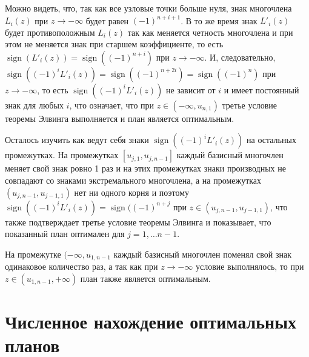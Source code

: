 \documentclass[specialist,
               substylefile = spbu.rtx,
               subf,href,colorlinks=true, 12pt]{disser}
\theoremstyle{definition}
\DeclareMathOperator*{\sign}{sign}
\begin{document}
	Можно видеть, что, так как все узловые точки больше нуля, знак многочлена $L_i(z)$ при $z \to -\infty$ будет равен $(-1)^{n+i+1}$. В то же время знак $L'_i(z)$ будет противоположным $L_i(z)$ так как меняется четность многочлена и при этом не меняется знак при старшем коэффициенте, то есть $\sign(L'_i(z)) = \sign((-1)^{n+i})$ при $z \to -\infty$. И, следовательно, $\sign((-1)^i L'_i(z)) = \sign((-1)^{n+2i}) = \sign((-1)^{n})$ при $z \to -\infty$, то есть $\sign((-1)^i L'_i(z))$ не зависит от $i$ и имеет постоянный знак для любых $i$, что означает, что при $z \in (-\infty, u_{n, 1})$ третье условие теоремы Элвинга выполняется и план является оптимальным.
	
	Осталось изучить как ведут себя знаки $\sign((-1)^i L'_i(z))$ на остальных промежутках. На промежутках $[u_{j, 1}, u_{j, n-1}]$ каждый базисный многочлен меняет свой знак ровно 1 раз и на этих промежутках знаки производных не совпадают со знаками экстремального многочлена, а на промежутках $(u_{j, n-1}, u_{j-1, 1})$ нет ни одного корня и поэтому $\sign((-1)^i L'_i(z)) = \sign ((-1)^{n + j}$ при $z \in (u_{j, n-1}, u_{j-1, 1})$, что также подтверждает третье условие теоремы Элвинга и показывает, что показанный план оптимален для $j=1, \ldots n-1$.
	
	На промежутке $(-\infty, u_{1, n-1}$ каждый базисный многочлен поменял свой знак одинаковое количество раз, а так как при $z \to -\infty$ условие выполнялось, то при $z \in (u_{1, n-1}, +\infty)$ план также является оптимальным.
	
	
	\chapter{Численное нахождение оптимальных планов}
	 
	
	
	
	
	
	

	
	\nocite{*}
	
	
	
\end{document}
